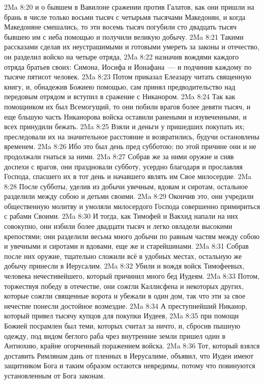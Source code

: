 \vs 2Ma 8:20 и о бывшем в Вавилоне сражении против Галатов, как они пришли на брань в числе только восьми тысяч с четырьмя тысячами Македонян, и когда Македоняне смешались, то эти восемь тысяч погубили сто двадцать тысяч бывшею им с неба помощью и получили великую добычу.
\vs 2Ma 8:21 Такими рассказами сделав их неустрашимыми и готовыми умереть за законы и отечество, он разделил войско на четыре отряда,
\vs 2Ma 8:22 назначив вождями каждого отряда братьев своих: Симона, Иосифа и Ионафана~--- и подчинив каждому по тысяче пятисот человек.
\vs 2Ma 8:23 Потом приказал Елеазару читать священную книгу, и, обнадежив Божиею помощью, сам принял предводительство над передовым отрядом и вступил в сражение с Никанором.
\vs 2Ma 8:24 Так как помощником их был Всемогущий, то они побили врагов более девяти тысяч, и еще бльшую часть Никанорова войска оставили ранеными и изувеченными, и всех принудили бежать.
\vs 2Ma 8:25 Взяли и деньги у пришедших покупать их; преследовали их на значительное расстояние и возвратились, будучи остановлены временем.
\vs 2Ma 8:26 Ибо это был день пред субботою; по этой причине они и не продолжали гнаться за ними.
\vs 2Ma 8:27 Собрав же за ними оружие и сняв доспехи с врагов, они праздновали субботу, усердно благодаря и прославляя Господа, спасшего их в тот день и начавшего являть им Свое милосердие.
\vs 2Ma 8:28 После субботы, уделив из добычи увечным, вдовам и сиротам, остальное разделили между собою и детьми своими.
\vs 2Ma 8:29 Окончив это, они учредили общественную молитву и умоляли милосердого Господа совершенно примириться с рабами Своими.
\vs 2Ma 8:30 И тогда, как Тимофей и Вакхид напали на них совокупно, они избили более двадцати тысяч и легко овладели высокими крепостями; они разделили весьма много добычи по равным частям между собою и увечными и сиротами и вдовами, еще же и старейшинами.
\vs 2Ma 8:31 Собрав после них оружие, тщательно сложили всё в удобных местах, остальную же добычу принесли в Иерусалим.
\vs 2Ma 8:32 Убили и вождя войск Тимофеевых, человека нечестивейшего, который причинил много бед Иудеям.
\vs 2Ma 8:33 Потом, торжествуя победу в отечестве, они сожгли Каллисфена и некоторых других, которые сожгли священные ворота и убежали в один дом, так что эти за свое нечестие понесли достойное возмездие.
\vs 2Ma 8:34 А преступнейший Никанор, который привел тысячу купцов для покупки Иудеев,
\vs 2Ma 8:35 при помощи Божией посрамлен был теми, которых считал за ничто, и, сбросив пышную одежду, под видом беглого раба чрез внутренние земли пришел один в Антиохию, крайне огорченный поражением войска.
\vs 2Ma 8:36 Тот, который взялся доставить Римлянам дань от пленных в Иерусалиме, объявил, что Иудеи имеют защитником Бога и таким образом остаются невредимы, потому что повинуются установленным от Бога законам.
